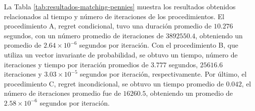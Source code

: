 La Tabla \ref{tab:resultados-matching-pennies} muestra los resultados obtenidos relacionados al tiempo y número de iteraciones de los procedimientos. El procedimiento A, regret condicional, tuvo una duración promedio de $10.276$ segundos, con un número promedio de iteraciones de $3892550.4$, obteniendo un promedio de $2.64 {\times} 10^{-6}$ segundos por iteración. Con el procedimiento B, que utiliza un vector invariante de probabilidad, se obtuvo un tiempo, número de iteraciones y tiempo por iteración promedios de $3.777$ segundos, $25616.6$ iteraciones y $3.03 {\times} 10^{-5}$ segundos por iteración, respectivamente. Por último, el procedimiento C, regret incondicional, se obtuvo un tiempo promedio de $0.042$, el número de iteraciones promedio fue de $16260.5$, obteniendo un promedio de $2.58 {\times} 10^{-6}$ segundos por iteración. 

